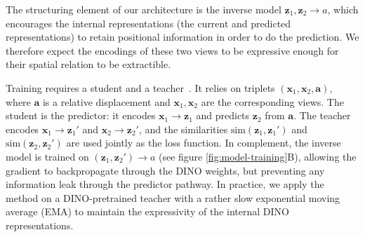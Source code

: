 \documentclass{article}
\begin{document}
The structuring element of our architecture is the inverse model $\boldsymbol{z}_1, \boldsymbol{z}_2 \rightarrow a$, which encourages the internal representations (the current and predicted representations) to retain positional information in order to do the prediction.
We therefore expect the encodings of these two views to be expressive enough for their spatial relation to be extractible. 

Training requires a student and a teacher~\cite{grill2020bootstrap,caron2021emerging}. It relies on triplets $(\boldsymbol{x}_1, \boldsymbol{x}_2, \boldsymbol{a})$, where $\boldsymbol{a}$ is a relative displacement and $\boldsymbol{x}_1, \boldsymbol{x}_2$ are the corresponding views. The student is the predictor: it encodes $\boldsymbol{x}_1 \rightarrow \boldsymbol{z}_1$ and predicts $\boldsymbol{z}_2$ from $\boldsymbol{a}$. The teacher encodes $\boldsymbol{x}_1 \rightarrow \boldsymbol{z}_1'$ and $\boldsymbol{x}_2 \rightarrow \boldsymbol{z}_2'$, and the similarities $\mathrm{sim}(\boldsymbol{z}_1,\boldsymbol{z}_1')$ and $\mathrm{sim}(\boldsymbol{z}_2,\boldsymbol{z}_2')$ are used jointly as the loss function. In complement, the inverse model is trained on $(\boldsymbol{z}_1, \boldsymbol{z}_2') \rightarrow a$ (see figure \ref{fig:model-training}B), allowing the gradient to backpropagate through the DINO weights, but preventing any information leak through the predictor pathway. In practice, we apply the method on a DINO-pretrained teacher with a rather slow exponential moving average (EMA) to maintain the expressivity of the internal DINO representations.

\end{document}
